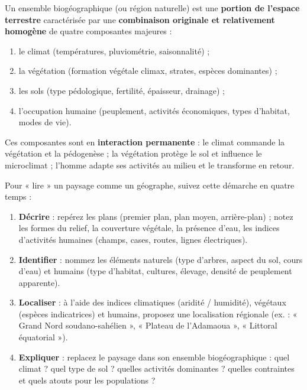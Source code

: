 \documentclass[11pt]{article}
\newcommand{\cle}[1]{{\popxbold\color{popdark}#1}}
\begin{document}
\begin{definition}
Un \cle{ensemble biogéographique} (ou région naturelle) est une \textbf{portion de l'espace terrestre} caractérisée par une \textbf{combinaison originale et relativement homogène} de quatre composantes majeures :
\begin{enumerate}
    \item le \cle{climat} (températures, pluviométrie, saisonnalité) ;
    \item la \cle{végétation} (formation végétale climax, strates, espèces dominantes) ;
    \item les \cle{sols} (type pédologique, fertilité, épaisseur, drainage) ;
    \item l'\cle{occupation humaine} (peuplement, activités économiques, types d'habitat, modes de vie).
\end{enumerate}
Ces composantes sont en \textbf{interaction permanente} : le climat commande la végétation et la pédogenèse ; la végétation protège le sol et influence le microclimat ; l'homme adapte ses activités au milieu et le transforme en retour.
\end{definition}

\begin{methode}
Pour « lire » un paysage comme un géographe, suivez cette démarche en quatre temps :
\begin{enumerate}
    \item \textbf{Décrire} : repérez les plans (premier plan, plan moyen, arrière-plan) ; notez les formes du relief, la couverture végétale, la présence d'eau, les indices d'activités humaines (champs, cases, routes, lignes électriques).
    \item \textbf{Identifier} : nommez les éléments naturels (type d'arbres, aspect du sol, cours d'eau) et humains (type d'habitat, cultures, élevage, densité de peuplement apparente).
    \item \textbf{Localiser} : à l'aide des indices climatiques (aridité / humidité), végétaux (espèces indicatrices) et humains, proposez une localisation régionale (ex. : « Grand Nord soudano-sahélien », « Plateau de l'Adamaoua », « Littoral équatorial »).
    \item \textbf{Expliquer} : replacez le paysage dans son ensemble biogéographique : quel climat ? quel type de sol ? quelles activités dominantes ? quelles contraintes et quels atouts pour les populations ?
\end{enumerate}
\end{methode}
\end{document}

